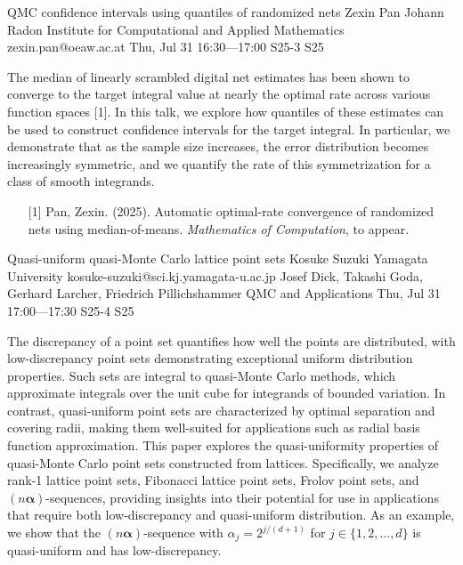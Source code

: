 \begin{talk}
  {QMC confidence intervals using quantiles of randomized nets}%
  {Zexin Pan}%
  {Johann Radon Institute for Computational and Applied Mathematics}%
  {zexin.pan@oeaw.ac.at}%
  {}%
  {}%
  {Thu, Jul 31 16:30---17:00}%
  {S25-3}%
  {S25}%
  {}%
  
    


The median of linearly scrambled digital net estimates has been shown to converge to the target integral value at nearly the optimal rate across various function spaces [1]. In this talk, we explore how quantiles of these estimates can be used to construct confidence intervals for the target integral. In particular, we demonstrate that as the sample size increases, the error distribution becomes increasingly symmetric, and we quantify the rate of this symmetrization for a class of smooth integrands.
            
\medskip


\begin{enumerate}
 \item[{[1]}] Pan, Zexin. (2025). Automatic optimal-rate convergence of randomized nets using median-of-means. {\it  Mathematics of Computation}, to appear.
\end{enumerate}

\end{talk}

\begin{talk}
  {Quasi-uniform quasi-Monte Carlo lattice point sets}%
  {Kosuke Suzuki}%
  {Yamagata University}%
  {kosuke-suzuki@sci.kj.yamagata-u.ac.jp}%
  {Josef Dick, Takashi Goda, Gerhard Larcher, Friedrich Pillichshammer}%
  {QMC and Applications}%
  {Thu, Jul 31 17:00---17:30}%
  {S25-4}%
  {S25}%
    
   

The discrepancy of a point set quantifies how well the points are distributed, with low-discrepancy point sets demonstrating exceptional uniform distribution properties. Such sets are integral to quasi-Monte Carlo methods, which approximate integrals over the unit cube for integrands of bounded variation. In contrast, quasi-uniform point sets are characterized by optimal separation and covering radii, making them well-suited for applications such as radial basis function approximation. This paper explores the quasi-uniformity properties of quasi-Monte Carlo point sets constructed from lattices. Specifically, we analyze rank-1 lattice point sets, Fibonacci lattice point sets, Frolov point sets, and $(n \boldsymbol{\alpha})$-sequences, providing insights into their potential for use in applications that require both low-discrepancy and quasi-uniform distribution. As an example, we show that the $(n \boldsymbol{\alpha})$-sequence with $\alpha_j = 2^{j/(d+1)}$ for $j \in \{1, 2, \ldots, d\}$ is quasi-uniform and has low-discrepancy.


\end{talk}

